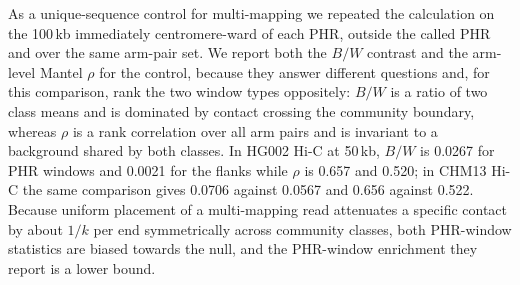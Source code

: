 As a unique-sequence control for multi-mapping we repeated the calculation on
the 100\,kb immediately centromere-ward of each PHR, outside the called PHR and
over the same arm-pair set. We report both the $B/W$ contrast and the arm-level
Mantel $\rho$ for the control, because they answer different questions and, for
this comparison, rank the two window types oppositely: $B/W$ is a ratio of two
class means and is dominated by contact crossing the community boundary,
whereas $\rho$ is a rank correlation over all arm pairs and is invariant to a
background shared by both classes. In HG002 Hi-C at 50\,kb, $B/W$ is 0.0267 for
PHR windows and 0.0021 for the flanks while $\rho$ is 0.657 and 0.520; in CHM13
Hi-C the same comparison gives 0.0706 against 0.0567 and 0.656 against 0.522.
Because uniform placement of a multi-mapping read attenuates a specific contact
by about $1/k$ per end symmetrically across community classes, both PHR-window
statistics are biased towards the null, and the PHR-window enrichment they
report is a lower bound.

